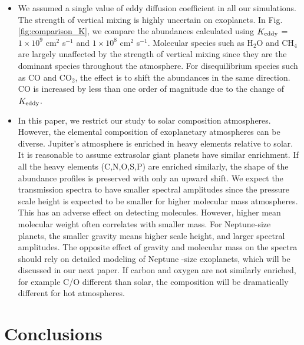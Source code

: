 \documentclass[twocolumn]{aastex61}
\begin{document}
\begin{itemize}
\item We assumed a single value of eddy diffusion coefficient in all our simulations. The strength of vertical mixing is highly uncertain on exoplanets. In Fig. \ref{fig:comparison_K}, we compare the abundances calculated using $K_{\rm eddy}$ = $1 \times 10^9$ cm$^2$ s$^{-1}$ and $1 \times 10^8$ cm$^2$ s$^{-1}$. Molecular species such as H$_2$O and CH$_4$ are largely unaffected by the strength of vertical mixing since they are the dominant species throughout the atmosphere. For disequilibrium species such as CO and CO$_2$, the effect is to shift the abundances in the same direction. CO is increased by less than one order of magnitude due to the change of $K_{\rm eddy}$. 

\item In this paper, we restrict our study to solar composition atmospheres. However, the elemental composition of exoplanetary atmospheres can be diverse. Jupiter's atmosphere is enriched in heavy elements relative to solar. It is reasonable to assume extrasolar giant planets have similar enrichment. If all the  heavy elements (C,N,O,S,P) are enriched similarly, the shape of the abundance profiles is preserved with only an upward shift. We expect the transmission spectra to have smaller spectral amplitudes since the pressure scale height is expected to be smaller for higher molecular mass atmospheres. This has an adverse effect on detecting molecules. However, higher mean molecular weight often correlates with smaller mass. For Neptune-size planets, the smaller gravity means higher scale height, and larger spectral amplitudes. The opposite effect of gravity and molecular mass on the spectra should rely on detailed modeling of Neptune -size exoplanets, which will be discussed in our next paper. 
If carbon and oxygen are not similarly enriched, for example C/O different than solar, the composition will be dramatically different for hot atmospheres. 

\end{itemize}


\section{Conclusions}\label{sec:conclusions}
\end{document}
